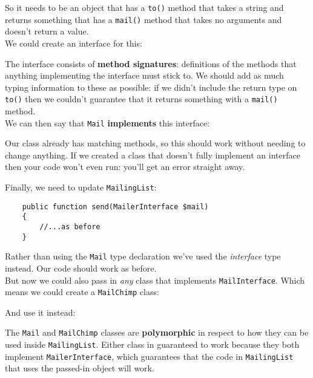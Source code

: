 So it needs to be an object that has a \texttt{to()} method that takes a string and returns something that has a \texttt{mail()} method that takes no arguments and doesn't return a value.
\\

We could create an interface for this:


The interface consists of \textbf{method signatures}: definitions of the methods that anything implementing the interface must stick to. We should add as much typing information to these as possible: if we didn't include the return type on \texttt{to()} then we couldn't guarantee that it returns something with a \texttt{mail()} method.
\\

We can then say that \texttt{Mail} \textbf{implements} this interface:


Our class already has matching methods, so this should work without needing to change anything. If we created a class that doesn't fully implement an interface then your code won't even run: you'll get an error straight away.


\pagebreak


Finally, we need to update \texttt{MailingList}:

\begin{verbatim}
    public function send(MailerInterface $mail)
    {
        //...as before
    }
\end{verbatim}

Rather than using the \texttt{Mail} type declaration we've used the \textit{interface} type instead. Our code should work as before.
\\

But now we could also pass in \textit{any} class that implements \texttt{MailInterface}. Which means we could create a \texttt{MailChimp} class:


And use it instead:


The \texttt{Mail} and \texttt{MailChimp} classes are \textbf{polymorphic} in respect to how they can be used inside \texttt{MailingList}. Either class in guaranteed to work because they both implement \texttt{MailerInterface}, which guarantees that the code in \texttt{MailingList} that uses the passed-in object will work.
\\

